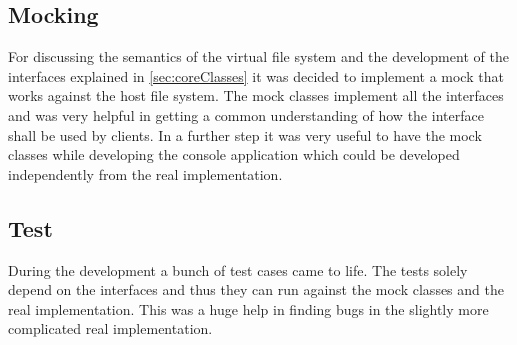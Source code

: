 \subsection{Mocking}
For discussing the semantics of the virtual file system and the development of 
the interfaces explained in \ref{sec:coreClasses} it was decided to implement a mock
that works against the host file system. The mock classes implement all
the interfaces and was very helpful in getting a common understanding of how the
interface shall be used by clients. In a further step it was very useful to have
the mock classes while developing the console application which could be
developed independently from the real implementation.
\subsection{Test}
During the development a bunch of test cases came to life. The tests solely
depend on the interfaces and thus they can run against the mock classes and the
real implementation. This was a huge help in finding bugs in the slightly more
complicated real implementation.